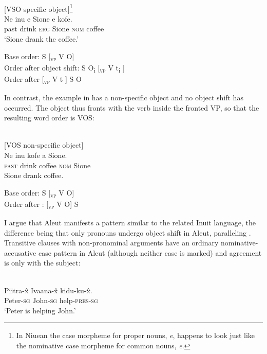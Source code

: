 \documentclass[output=paper]{LSP/langsci}
\begin{document}
\ea\label{ex:woolford:11}
\\{}
    [VSO   specific object]\footnote{In Niuean the  case morpheme for proper nouns, \textit{e}, happens to look just like the nominative case morpheme for common nouns, \textit{e}.}\\
\gll Ne  inu  e  Sione    e  kofe.\\
     past  drink  \textsc{erg} Sione    \textsc{nom} coffee\\
\glt ‘Sione drank the coffee.’
\z

\ea\label{ex:woolford:12}
\ea Base order:        S  [\textsc{\textsubscript{vp}} V O]\\
\ex Order after object shift:    S  O\textsubscript{i}  [\textsc{\textsubscript{vp}} V  t\textsubscript{i} ]\\
\ex Order after     [\textsc{\textsubscript{vp}} V  t ]  S  O
\z
\z

In contrast, the example in  has a non-specific object and no object shift has occurred. The object thus fronts with the verb inside the fronted VP, so that the resulting word order is VOS:



\ea\label{ex:woolford:13}
\\{}
     [VOS   non-specific object]\\
\gll Ne  inu    kofe    a   Sione.                \\
     \textsc{past}  drink    coffee    \textsc{nom} Sione\\
\glt Sione drank coffee.
\z

\ea\label{ex:woolford:14}
\ea Base order:      S  [\textsc{\textsubscript{vp}} V O]\\
\ex Order after :  [\textsc{\textsubscript{vp}} V O]  S
\z
\z

I argue that Aleut manifests a pattern similar to the related Inuit language, the difference being that only pronouns undergo object shift in Aleut, paralleling . Transitive clauses with non-pronominal arguments have an ordinary nominative-accusative case pattern in Aleut (although neither case is marked) and agreement is only with the subject:

  


\ea\label{ex:woolford:15}
\\
\gll Piitra-\^{x}    Ivaana-\^{x}  kidu-ku-\^{x}.\\
     Peter-\textsc{sg}  John-\textsc{sg}  help-\textsc{pres}-\textsc{sg}\\
\glt ‘Peter is helping John.’ 
\z
\end{document}

